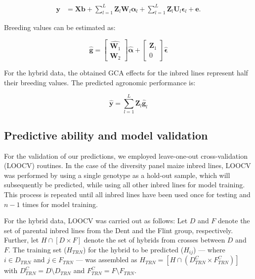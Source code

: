 \documentclass[12pt,titlepage]{article}
\begin{document}
\begin{align} \label{eq:final-model}
\mathbf{y} &= \mathbf{Xb} +
\sum_{l=1}^{L} \mathbf{Z}_{l}\mathbf{W}_{l} \boldsymbol{\alpha}_{l} + 
\sum_{l=1}^{L} \mathbf{Z}_{l}\mathbf{U}_{l} \boldsymbol{\epsilon}_{l} +
\mathbf{e}.
\end{align}


Breeding values can be estimated as:

\begin{equation} \label{eq:breeding-values}
\hat{\mathbf{g}} = 
 \begin{bmatrix}
  \hat{\mathbf{W}_1} \\
  \mathbf{W}_2 
 \end{bmatrix}
 \hat{\boldsymbol{\alpha}}
 + 
 \begin{bmatrix}
  \mathbf{Z}_1 \\
  0
 \end{bmatrix}
 \hat{\boldsymbol{\epsilon}} 
\end{equation}

For the hybrid data, the obtained GCA effects for the inbred lines represent 
half their breeding values.
The predicted agronomic performance is:

\begin{equation} \label{eq:predicted-performance}
\hat{\mathbf{y}} = \sum_{l=1}^{L} \mathbf{Z}_{l}\hat{\mathbf{g}}_{l} 
\end{equation}




\subsection{Predictive ability and model validation}
For the validation of our predictions, we employed leave-one-out
cross-validation (LOOCV) routines.
In the case of the diversity panel maize inbred lines, LOOCV was performed by 
using a single genotype as a hold-out sample, which will subsequently be 
predicted, while using all other inbred lines for model training.
This process is repeated until all inbred lines have been used once for testing
and $n - 1$ times for model training.

For the hybrid data, LOOCV was carried out as follows:
Let $D$ and $F$ denote the set of parental inbred lines from the Dent and the 
Flint group, respectively.
Further, let $H \cap [D \times F]$ denote the set of hybrids from crosses 
between $D$ and $F$.
The training set ($H_{TRN}$) for the hybrid to be predicted ($H_{ij}$) --- 
where $i \in D_{TRN}$ and $j \in F_{TRN}$ --- was assembled as 
$H_{TRN} = [H \cap (D_{TRN}^{C} \times F_{TRN}^{C})]$ with
$D_{TRN}^{C} = D \setminus D_{TRN}$ and $F_{TRN}^{C} = F \setminus F_{TRN}$.
\end{document}
